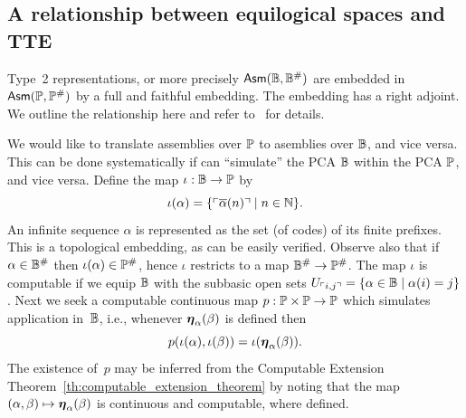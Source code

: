 \subsection{A relationship between equilogical spaces and TTE}
\label{sec:equ-tte}

Type~2 representations, or more precisely $\mathsf{Asm}(\mathbb{B},
  \mathbb{B}^{\#})$ are embedded in $\mathsf{Asm}(\mathbb{P}, \mathbb{P}^{\#})$ by a
full and faithful embedding. The embedding has a right adjoint. We
outline the relationship here and refer to~\cite{Bauer:equ-tte} for
details.

We would like to translate assemblies over $\mathbb{P}$ to asemblies over
$\mathbb{B}$, and vice versa. This can be done systematically if can
``simulate'' the PCA $\mathbb{B}$ within the PCA $\mathbb{P}$, and vice versa.
%
Define the map $\iota : \mathbb{B} \to \mathbb{P}$ by
\begin{equation*}
  \iota(\alpha) =
  \{ \ulcorner \overline{\alpha}(n) \urcorner \mid n \in \mathbb{N}\}.
\end{equation*}
An infinite sequence $\alpha$ is represented as the set (of codes) of
its finite prefixes. This is a topological embedding, as can be easily
verified. Observe also that if $\alpha \in \mathbb{B}^{\#}$ then
$\iota(\alpha) \in \mathbb{P}^{\#}$, hence $\iota$ restricts to a map
$\mathbb{B}^{\#} \to \mathbb{P}^{\#}$.
%
The map $\iota$ is computable if we equip $\mathbb{B}$ with the subbasic
open sets $U_{\ulcorner i,j \urcorner} = \{\alpha \in \mathbb{B} \mid \alpha(i) =
  j\}$. Next we seek a computable continuous map $p : \mathbb{P} \times
\mathbb{P} \to \mathbb{P}$ which simulates application in~$\mathbb{B}$, i.e.,
whenever $\text{\boldmath{$\eta$}}_{\alpha}(\beta)$ is defined then
%
\begin{equation*}
  p (\iota(\alpha), \iota(\beta)) = \iota(\text{\boldmath{$\eta$}}_{\alpha}(\beta)).
\end{equation*}
%
The existence of~$p$ may be inferred from the Computable Extension
Theorem~\ref{th:computable_extension_theorem} by noting that the map
$(\alpha, \beta) \mapsto \text{\boldmath{$\eta$}}_{\alpha}(\beta)$ is continuous and
computable, where defined.


